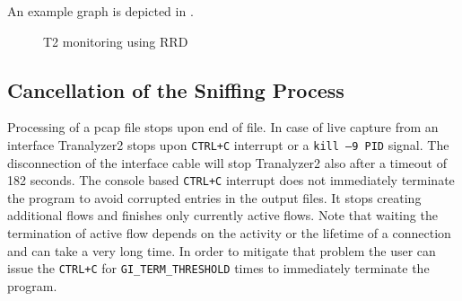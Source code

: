 An example graph is depicted in .

\begin{figure}[!ht]
    \centering
    \caption{T2 monitoring using RRD}
    \label{fig:rrdplot}
\end{figure}

\subsection{Cancellation of the Sniffing Process}
Processing of a pcap file stops upon end of file. In case of live capture from an interface Tranalyzer2 stops upon {\tt CTRL+C} interrupt or a {\tt kill --9 PID} signal. The disconnection of the interface cable will stop Tranalyzer2 also after a timeout of 182 seconds. The console based {\tt CTRL+C} interrupt does not immediately terminate the program to avoid corrupted entries in the output files. It stops creating additional flows and finishes only currently active flows. Note that waiting the termination of active flow depends on the activity or the lifetime of a connection and can take a very long time. In order to mitigate that problem the user can issue the {\tt CTRL+C} for {\tt GI\_TERM\_THRESHOLD} times to immediately terminate the program.
